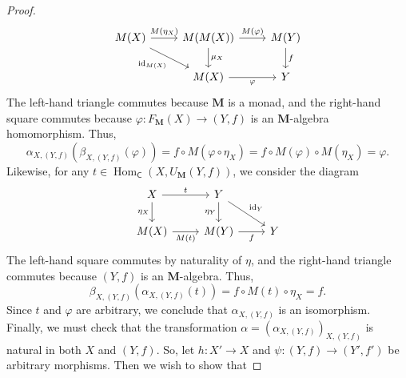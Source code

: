\documentclass{article}
\theoremstyle{definition}
\newcommand{\C}{\mathsf{C}}
\newcommand{\M}{\mathbf{M}}
\DeclareMathOperator{\id}{id}
\DeclareMathOperator{\Hom}{Hom}
\begin{document}
\begin{proof}
    \[\begin{tikzcd}[ampersand replacement=\&]
    	{M(X)} \& {M(M(X))} \& {M(Y)} \\
    	\& {M(X)} \& Y
    	\arrow["{M(\eta_X)}", from=1-1, to=1-2]
    	\arrow["{M(\varphi)}", from=1-2, to=1-3]
    	\arrow["f", from=1-3, to=2-3]
    	\arrow["{\mu_X}", from=1-2, to=2-2]
    	\arrow["{\id_{M(X)}}"', from=1-1, to=2-2]
    	\arrow["\varphi"', from=2-2, to=2-3]
    \end{tikzcd}\]
    The left-hand triangle commutes because $\M$ is a monad, and the right-hand square commutes because $\varphi : F_{\M}(X) \to (Y,f)$ is an $\M$-algebra homomorphism. Thus,
    \[\alpha_{X,(Y,f)}(\beta_{X,(Y,f)}(\varphi)) = f \circ M(\varphi \circ \eta_X) = f \circ M(\varphi) \circ M(\eta_X) = \varphi.\]
    Likewise, for any $t \in \Hom_{\C}(X,U_{\M}(Y,f))$, we consider the diagram
    \[\begin{tikzcd}[ampersand replacement=\&]
    	X \& Y \\
    	{M(X)} \& {M(Y)} \& Y
    	\arrow["t", from=1-1, to=1-2]
    	\arrow["{\id_Y}", from=1-2, to=2-3]
    	\arrow["{\eta_X}"', from=1-1, to=2-1]
    	\arrow["{M(t)}"', from=2-1, to=2-2]
    	\arrow["{\eta_Y}"', from=1-2, to=2-2]
    	\arrow["f"', from=2-2, to=2-3]
    \end{tikzcd}\]
    The left-hand square commutes by naturality of $\eta$, and the right-hand triangle commutes because $(Y,f)$ is an $\M$-algebra. Thus,
    \[\beta_{X,(Y,f)}(\alpha_{X,(Y,f)}(t)) = f \circ M(t) \circ \eta_X = f.\]
    Since $t$ and $\varphi$ are arbitrary, we conclude that $\alpha_{X,(Y,f)}$ is an isomorphism. Finally, we must check that the transformation $\alpha = (\alpha_{X,(Y,f)})_{X,(Y,f)}$ is natural in both $X$ and $(Y,f)$. So, let $h : X' \to X$ and $\psi : (Y,f) \to (Y',f')$ be arbitrary morphisms. Then we wish to show that

\end{proof}
\end{document}
